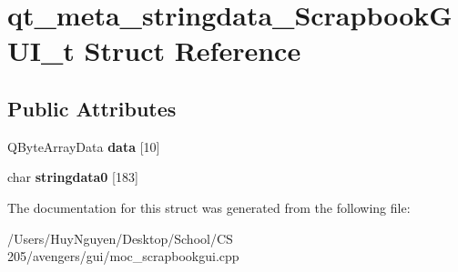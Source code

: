 \hypertarget{structqt__meta__stringdata__ScrapbookGUI__t}{}\section{qt\+\_\+meta\+\_\+stringdata\+\_\+\+Scrapbook\+G\+U\+I\+\_\+t Struct Reference}
\label{structqt__meta__stringdata__ScrapbookGUI__t}
\subsection*{Public Attributes}
\begin{DoxyCompactItemize}
\item 
Q\+Byte\+Array\+Data {\bfseries data} \mbox{[}10\mbox{]}\hypertarget{structqt__meta__stringdata__ScrapbookGUI__t_a45a5584cd82bb67618b888635de9e63b}{}\label{structqt__meta__stringdata__ScrapbookGUI__t_a45a5584cd82bb67618b888635de9e63b}

\item 
char {\bfseries stringdata0} \mbox{[}183\mbox{]}\hypertarget{structqt__meta__stringdata__ScrapbookGUI__t_a5b06910c95a8adabd37e974a6e9a3f62}{}\label{structqt__meta__stringdata__ScrapbookGUI__t_a5b06910c95a8adabd37e974a6e9a3f62}

\end{DoxyCompactItemize}


The documentation for this struct was generated from the following file\+:\begin{DoxyCompactItemize}
\item 
/\+Users/\+Huy\+Nguyen/\+Desktop/\+School/\+C\+S 205/avengers/gui/moc\+\_\+scrapbookgui.\+cpp\end{DoxyCompactItemize}
